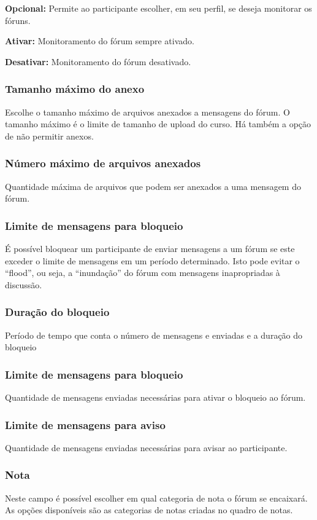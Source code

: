 \textbf{Opcional:} Permite ao participante escolher, em seu perfil, se deseja monitorar os fóruns.

\textbf{Ativar:} Monitoramento do fórum sempre ativado.

\textbf{Desativar:} Monitoramento do fórum desativado.

\subsubsection{Tamanho máximo do anexo}
Escolhe o tamanho máximo de arquivos anexados a mensagens do fórum. O tamanho máximo é o limite de tamanho de upload do curso. Há também a opção de não permitir anexos.

\subsubsection{Número máximo de arquivos anexados}
Quantidade máxima de arquivos que podem ser anexados a uma mensagem do fórum.

\subsubsection{Limite de mensagens para bloqueio}
É possível bloquear um participante de enviar mensagens a um fórum se este exceder o limite de mensagens em um período determinado. Isto pode evitar o “flood”, ou seja, a “inundação” do fórum com mensagens inapropriadas à discussão.
\subsubsection{Duração do bloqueio}
Período de tempo que conta o número de mensagens e enviadas e a duração do bloqueio
\subsubsection{Limite de mensagens para bloqueio}
Quantidade de mensagens enviadas necessárias para ativar o bloqueio ao fórum.
\subsubsection{Limite de mensagens para aviso}
Quantidade de mensagens enviadas necessárias para avisar ao participante.
\subsubsection{Nota}
Neste campo é possível escolher em qual categoria de nota o fórum se encaixará. As opções disponíveis são as categorias de notas criadas no quadro de notas.

